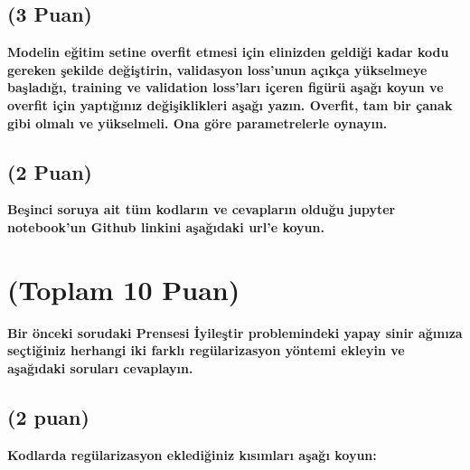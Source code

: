 \documentclass[11pt]{article}
\begin{document}
\begin{table}[ht!]
 
    \begin{tabular}{c|c}
     
    \end{tabular}
   
\end{table}

\subsection{(3 Puan)} \textbf{Modelin eğitim setine overfit etmesi için elinizden geldiği kadar kodu gereken şekilde değiştirin, validasyon loss'unun açıkça yükselmeye başladığı, training ve validation loss'ları içeren figürü aşağı koyun ve overfit için yaptığınız değişiklikleri aşağı yazın. Overfit, tam bir çanak gibi olmalı ve yükselmeli. Ona göre parametrelerle oynayın.}



\begin{comment}
\begin{figure}[ht!]
   
\end{figure}
\end{comment}

\subsection{(2 Puan)} \textbf{Beşinci soruya ait tüm kodların ve cevapların olduğu jupyter notebook'un Github linkini aşağıdaki url'e koyun.}

\url{}

\section{(Toplam 10 Puan)} \textbf{Bir önceki sorudaki Prensesi İyileştir problemindeki yapay sinir ağınıza seçtiğiniz herhangi iki farklı regülarizasyon yöntemi ekleyin ve aşağıdaki soruları cevaplayın.} 

\subsection{(2 puan)} \textbf{Kodlarda regülarizasyon eklediğiniz kısımları aşağı koyun:} 

\begin{python}

\end{python}
\end{document}
